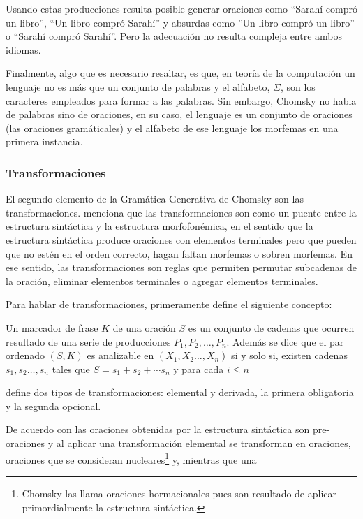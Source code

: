 Usando estas producciones resulta posible generar oraciones como ``Sarahí compró un libro'', ``Un libro compró Sarahí'' y absurdas como ''Un libro compró un libro'' o ``Sarahí compró Sarahí''. Pero la adecuación no resulta compleja entre ambos idiomas. 

Finalmente, algo que es necesario resaltar, es que, en teoría de la computación un lenguaje no es más que un conjunto de palabras y el alfabeto, $\Sigma$, son los caracteres empleados para formar a las palabras. Sin embargo, Chomsky no habla de palabras sino de oraciones, en su caso, el lenguaje es un conjunto de oraciones (las oraciones gramáticales) y el alfabeto de ese lenguaje los morfemas en una primera instancia.

\subsubsection{Transformaciones}

El segundo elemento de la Gramática Generativa de Chomsky son las transformaciones. \cite{chomsky2004estructuras} menciona que las transformaciones son como un puente entre la estructura sintáctica y la estructura morfofonémica, en el sentido que la estructura sintáctica produce oraciones con elementos terminales pero que pueden que no estén en el orden correcto, hagan faltan morfemas o sobren morfemas. En ese sentido, las transformaciones son reglas que permiten permutar subcadenas de la oración, eliminar elementos terminales o agregar elementos terminales.

Para hablar de transformaciones, \cite{chomsky1956three} primeramente define el siguiente concepto:

\begin{defi}
	Un marcador de frase $K$ de una oración $S$ es un conjunto de cadenas que ocurren resultado de una serie de producciones $P_1,P_2,\ldots,P_n$. Además se dice que el par ordenado $(S,K)$ es analizable en $\left(X_1,X_2\ldots,X_n\right)$ si y solo si, existen cadenas $s_1,s_2\ldots,s_n$ tales que $S = s_1 + s_2 + \cdots s_n$ y para cada $i\leq n$  
\end{defi}

 define dos tipos de transformaciones: elemental y derivada, la primera obligatoria y la segunda opcional.



 De acuerdo con \cite{allerton1979essentials} las oraciones obtenidas por la estructura sintáctica son pre-oraciones y al aplicar una transformación elemental se transforman en oraciones, oraciones que se consideran nucleares\footnote{Chomsky las llama oraciones hormacionales pues son resultado de aplicar primordialmente la estructura sintáctica.} y, mientras que una 


